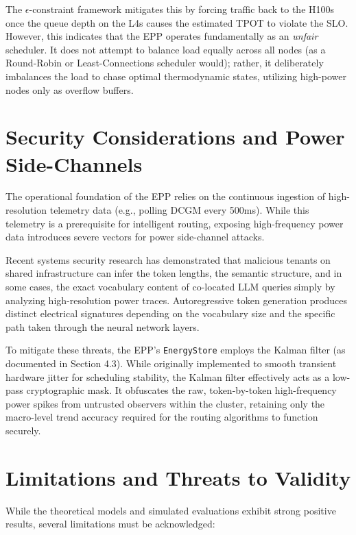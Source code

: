 \documentclass[12pt,a4paper,oneside]{report}
\begin{document}
The \(\epsilon\)-constraint framework mitigates this by forcing traffic back to the H100s once the queue depth on the L4s causes the estimated TPOT to violate the SLO. However, this indicates that the EPP operates fundamentally as an \textit{unfair} scheduler. It does not attempt to balance load equally across all nodes (as a Round-Robin or Least-Connections scheduler would); rather, it deliberately imbalances the load to chase optimal thermodynamic states, utilizing high-power nodes only as overflow buffers.

\section{Security Considerations and Power Side-Channels}
\label{sec:disc_security}

The operational foundation of the EPP relies on the continuous ingestion of high-resolution telemetry data (e.g., polling DCGM every 500ms). While this telemetry is a prerequisite for intelligent routing, exposing high-frequency power data introduces severe vectors for power side-channel attacks. 

Recent systems security research has demonstrated that malicious tenants on shared infrastructure can infer the token lengths, the semantic structure, and in some cases, the exact vocabulary content of co-located LLM queries simply by analyzing high-resolution power traces. Autoregressive token generation produces distinct electrical signatures depending on the vocabulary size and the specific path taken through the neural network layers.

To mitigate these threats, the EPP's \texttt{EnergyStore} employs the Kalman filter (as documented in Section 4.3). While originally implemented to smooth transient hardware jitter for scheduling stability, the Kalman filter effectively acts as a low-pass cryptographic mask. It obfuscates the raw, token-by-token high-frequency power spikes from untrusted observers within the cluster, retaining only the macro-level trend accuracy required for the routing algorithms to function securely.

\section{Limitations and Threats to Validity}
\label{sec:disc_limitations}

While the theoretical models and simulated evaluations exhibit strong positive results, several limitations must be acknowledged:
\end{document}
